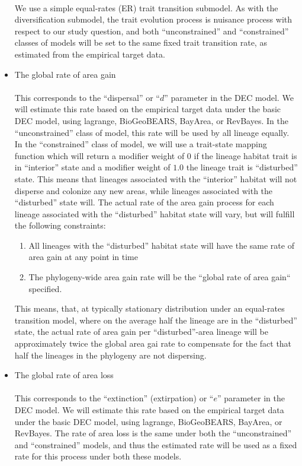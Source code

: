 \documentclass[11pt,openany]{memoir} %
\begin{document}
\begin{itemize}
        \\
        We use a simple equal-rates (ER) trait transition submodel.
        As with the diversification submodel, the trait evolution process is nuisance process with respect to our study question, and both ``unconstrained'' and ``constrained'' classes of models will be set to the same fixed trait transition rate, as estimated from the empirical target data.
    \item The global rate of area gain \hfill \\
        \\
        This corresponds to the ``dispersal'' or ``$d$'' parameter in the DEC model.
        We will estimate this rate based on the empirical target data under the basic DEC model, using lagrange, BioGeoBEARS, BayArea, or RevBayes.
        In the ``unconstrained'' class of model, this rate will be used by all lineage equally.
        In the ``constrained'' class of model, we will use a trait-state mapping function which will return a modifier weight of $0$ if the lineage habitat trait is in ``interior'' state and a modifier weight of $1.0$ the lineage trait is ``disturbed'' state.
        This means that lineages associated with the ``interior'' habitat will not disperse and colonize any new areas, while lineages associated with the ``disturbed'' state will.
        The actual rate of the area gain process for each lineage associated with the ``disturbed'' habitat state will vary, but will fulfill the following constraints:
        \begin{enumerate}
            \item All lineages with the ``disturbed'' habitat state will have the same rate of area gain at any point in time
            \item The phylogeny-wide area gain rate will be the ``global rate of area gain`` specified.
        \end{enumerate}
        This means, that, at typically stationary distribution under an equal-rates transition model, where on the average half the lineage are in the ``disturbed'' state, the actual rate of area gain per ``disturbed''-area lineage will be approximately twice the global area gai rate to compensate for the fact that half the lineages in the phylogeny are not dispersing.
    \item The global rate of area loss \hfill \\
        \\
        This corresponds to the ``extinction'' (extirpation) or ``$e$'' parameter in the DEC model.
        We will estimate this rate based on the empirical target data under the basic DEC model, using lagrange, BioGeoBEARS, BayArea, or RevBayes.
        The rate of area loss is the same under both the ``unconstrained'' and ``constrained'' models, and thus the estimated rate will be used as a fixed rate for this process under both these models.

\end{itemize}
\end{document}
